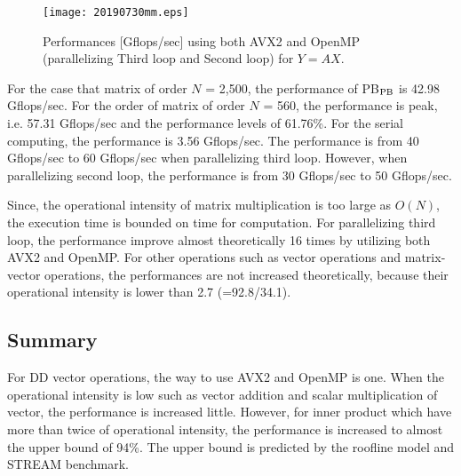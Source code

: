 \documentclass{IOS-Book-Article}
\begin{document}
\begin{figure}[htbp]
  \begin{center}
    \texttt{[image: 20190730mm.eps]}
         \caption{Performances [Gflops/sec] using both AVX2 and OpenMP (parallelizing Third loop and Second loop) for $Y = AX$.}
    \label{figMM3}
  \end{center}
\end{figure}

For the case that matrix of order $N$ = 2,500, the performance of PB$_{\rm{PB}}$ is 42.98 Gflops/sec.
For the order of matrix of order $N$ = 560, the performance is peak, i.e. 57.31 Gflops/sec and the performance levels of 61.76\%. For the serial computing, the performance is 3.56 Gflops/sec.
The performance is from 40 Gflops/sec to 60 Gflops/sec when parallelizing third loop. However, when parallelizing second loop, the performance is from 30 Gflops/sec to 50 Gflops/sec. 

Since, the operational intensity of matrix multiplication is too large as $O(N)$, the execution time is bounded on time for computation. For parallelizing third loop, the performance improve almost theoretically 16 times by utilizing both AVX2 and OpenMP.
For other operations such as vector operations and matrix-vector operations, the performances are not increased theoretically, because their operational intensity is lower than 2.7 (=92.8/34.1). %



\subsection{Summary}

For DD vector operations, the way to use AVX2 and OpenMP is one. When the operational intensity is low  such as vector addition and scalar multiplication of vector, the performance is increased little. However, for inner product which have more than twice of operational intensity, the performance is increased to almost the upper bound of 94\%. The upper bound is predicted by the roofline model and STREAM benchmark.
\end{document}

